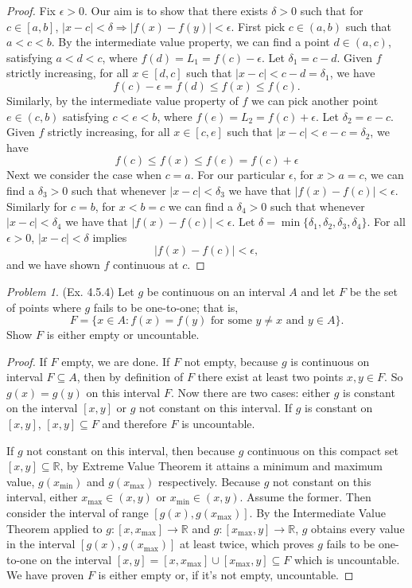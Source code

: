 \documentclass[11pt,twoside, reqno]{amsart}
\theoremstyle{remark}
\newtheorem{Prob}{Problem}
\def\R{\mathbb R}
\renewcommand{\implies}{\Rightarrow}
\begin{document}
\begin{proof}
Fix $\epsilon > 0$. Our aim is to show that there exists $\delta > 0$ such that for $c \in [a,b]$, $|x - c| < \delta \implies |f(x) - f(y)| < \epsilon$. First pick $c \in (a,b)$ such that $a < c < b$. By the intermediate value property, we can find a point $d \in (a,c)$, satisfying $a < d < c$, where $f(d) = L_1 = f(c) - \epsilon$. Let $\delta_1 = c - d$. Given $f$ strictly increasing, for all $x \in [d,c]$ such that $|x - c| < c - d = \delta_1$, we have
$$
    f(c) - \epsilon = f(d) \leq f(x) \leq f(c).
$$
Similarly, by the intermediate value property of $f$ we can pick another point $e \in (c,b)$ satisfying $c < e < b$, where $f(e) = L_2 = f(c) + \epsilon$. Let $\delta_2 = e - c$. Given $f$ strictly increasing, for all $x \in [c,e]$ such that $|x - c| < e - c = \delta_2$, we have
$$
    f(c) \leq f(x) \leq f(e) = f(c) + \epsilon
$$
Next we consider the case when $c = a$. For our particular $\epsilon$, for $x > a = c$, we can find a $\delta_3 > 0$ such that whenever $|x - c| < \delta_3$ we have that $|f(x) - f(c)| < \epsilon$. Similarly for $c = b$, for $x < b = c$ we can find a $\delta_4 > 0$ such that whenever $|x - c| < \delta_4$ we have that $|f(x) - f(c)| < \epsilon$. Let $\delta = \min \{\delta_1, \delta_2, \delta_3, \delta_4\}$. For all $\epsilon > 0$, $|x - c| < \delta$ implies
$$
    |f(x) - f(c)| < \epsilon,
$$
and we have shown $f$ continuous at $c$.

\end{proof}

\begin{Prob}(Ex. 4.5.4) Let $g$ be continuous on an interval $A$ and let $F$ be the set of points where $g$ fails to be one-to-one; that is,
$$
    F = \{x \in A : f(x) = f(y) \text{ for some $y \neq x$ and $y \in A$}\}.
$$
Show $F$ is either empty or uncountable.
\end{Prob}

\begin{proof}
If $F$ empty, we are done. If $F$ not empty, because $g$ is continuous on interval $F \subseteq A$, then by definition of $F$ there exist at least two points $x,y \in F$. So $g(x) = g(y)$ on this interval $F$. Now there are two cases: either $g$ is constant on the interval $[x,y]$ or $g$ not constant on this interval. If $g$ is constant on $[x,y]$, $[x,y] \subseteq F$ and therefore $F$ is uncountable. 

If $g$ not constant on this interval, then because $g$ continuous on this compact set $[x,y] \subseteq \R$, by Extreme Value Theorem it attains a minimum and maximum value, $g(x_{\min})$ and $g(x_{\max})$ respectively. Because $g$ not constant on this interval, either $x_{\max} \in (x,y)$ or $x_{\min} \in (x,y)$. Assume the former. Then consider the interval of range $[g(x),g(x_{\max})]$. By the Intermediate Value Theorem applied to $g:[x,x_{\max}] \to \R$ and $g:[x_{\max},y] \to \R$, $g$ obtains every value in the interval $[g(x),g(x_{\max})]$ at least twice, which proves $g$ fails to be one-to-one on the interval $[x,y] = [x,x_{\max}] \cup [x_{\max},y] \subseteq F$ which is uncountable. We have proven $F$ is either empty or, if it's not empty, uncountable.
\end{proof}
\end{document}

